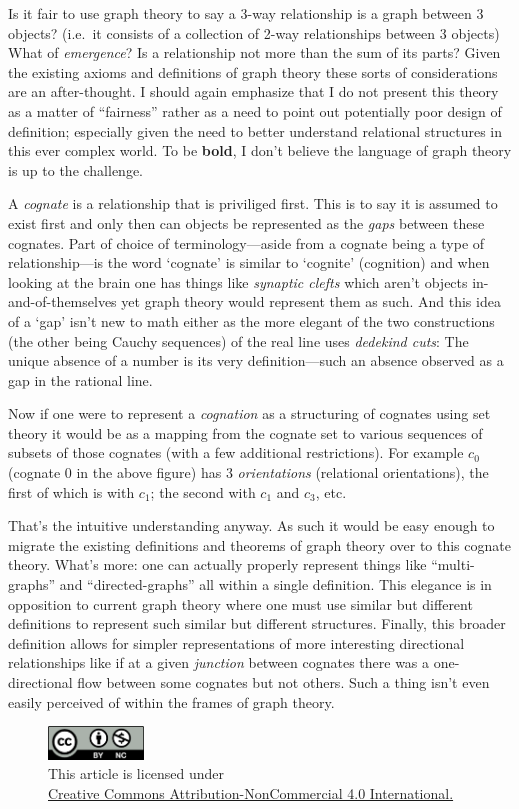 \documentclass[twoside]{article}
\begin{document}
Is it fair to use graph theory to say a 3-way relationship is a graph between 3 objects?  (i.e.~it consists of a collection
of 2-way relationships between 3 objects) What of \emph{emergence}? Is a relationship not more than the sum of its parts?
Given the existing axioms and definitions of graph theory these sorts of considerations are an after-thought. I should
again emphasize that I do not present this theory as a matter of ``fairness'' rather as a need to point out potentially
poor design of definition; especially given the need to better understand relational structures in this ever complex world.
To be {\bfseries bold}, I don't believe the language of graph theory is up to the challenge.

A \emph{cognate} is a relationship that is priviliged first. This is to say it is assumed to exist first and only
then can objects be represented as the \emph{gaps} between these cognates. Part of choice of terminology---aside from
a cognate being a type of relationship---is the word `cognate' is similar to `cognite' (cognition) and when looking
at the brain one has things like \emph{synaptic clefts} which aren't objects in-and-of-themselves yet graph theory
would represent them as such. And this idea of a `gap' isn't new to math either as the more elegant of the two constructions
(the other being Cauchy sequences) of the real line uses \emph{dedekind cuts}: The unique absence of a number is its very
definition---such an absence observed as a gap in the rational line.

Now if one were to represent a \emph{cognation} as a structuring of cognates using set theory it would be as a mapping from
the cognate set to various sequences of subsets of those cognates (with a few additional restrictions). For example $ c_0 $
(cognate $ 0 $ in the above figure) has 3 \emph{orientations} (relational orientations), the first of which is with $ c_1 $;
the second with $ c_1 $ and $ c_3 $, etc.

That's the intuitive understanding anyway. As such it would be easy enough to migrate the existing definitions and theorems of graph
theory over to this cognate theory. What's more: one can actually properly represent things like ``multi-graphs'' and ``directed-graphs''
all within a single definition. This elegance is in opposition to current graph theory where one must use similar but different
definitions to represent such similar but different structures. Finally, this broader definition allows for simpler representations
of more interesting directional relationships like if at a given \emph{junction} between cognates there was a one-directional
flow between some cognates but not others. Such a thing isn't even easily perceived of within the frames of graph theory.

\begin{figure}[h]
\centering
\includegraphics[width=1in]{cc-by-nc.png}\\[0.1in]
\tiny This article is licensed under \\
\href{http://creativecommons.org/licenses/by-nc/4.0/}
{Creative Commons Attribution-NonCommercial 4.0 International.}\\[0.3in]
\end{figure}
\end{document}
